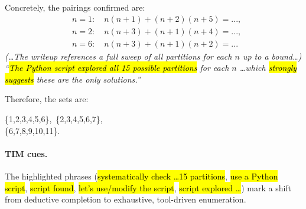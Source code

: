\documentclass[11pt]{article}
\def \task{\textsc{TIM}\xspace}
\begin{document}
\begin{example}[title=Example 1. Gemini-2.5-Flash]
Concretely, the pairings confirmed are:
\[
\begin{aligned}
&n=1:\quad n(n+1)+(n+2)(n+5)=...,\\
&n=2:\quad n(n+3)+(n+1)(n+4)=...,\\
&n=6:\quad n(n+3)+(n+1)(n+2)=...
\end{aligned}
\]
\textit{(…The writeup references a full sweep of all partitions for each $n$ up to a bound…)}  
\textit{“\hl{The Python script explored all 15 possible partitions} for each $n$ \dots which \hl{strongly suggests} these are the only solutions.”}

Therefore, the sets are:

\{1,2,3,4,5,6\},\ \{2,3,4,5,6,7\},\ \\ \{6,7,8,9,10,11\}.


\paragraph{\task{} cues.}
The highlighted phrases (\hl{systematically check \dots 15 partitions}, \hl{use a Python script}, \hl{script found}, \hl{let’s use/modify the script}, \hl{script explored \dots}) mark a shift from deductive completion to exhaustive, tool-driven enumeration.
\end{example}


\end{document}
